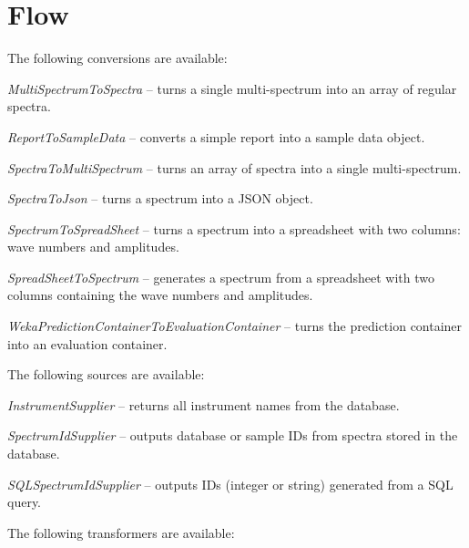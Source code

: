 \documentclass[a4paper]{book}
\begin{document}
\chapter{Flow}
The following conversions are available:
\begin{tight_itemize}
  \item \textit{MultiSpectrumToSpectra} -- turns a single multi-spectrum
  into an array of regular spectra.
  \item \textit{ReportToSampleData} -- converts a simple report into
  a sample data object.
  \item \textit{SpectraToMultiSpectrum} -- turns an array of spectra
  into a single multi-spectrum.
  \item \textit{SpectraToJson} -- turns a spectrum into a JSON object.
  \item \textit{SpectrumToSpreadSheet} -- turns a spectrum into a spreadsheet
  with two columns: wave numbers and amplitudes.
  \item \textit{SpreadSheetToSpectrum} -- generates a spectrum from a spreadsheet
  with two columns containing the wave numbers and amplitudes.
  \item \textit{WekaPredictionContainerToEvaluationContainer} -- turns the
  prediction container into an evaluation container.
\end{tight_itemize}
The following sources are available:
\begin{tight_itemize}
  \item \textit{InstrumentSupplier} -- returns all instrument names from the
  database.
  \item \textit{SpectrumIdSupplier} -- outputs database or sample IDs from spectra
  stored in the database.
  \item \textit{SQLSpectrumIdSupplier} -- outputs IDs (integer or string)
  generated from a SQL query.
\end{tight_itemize}
The following transformers are available:
\end{document}
